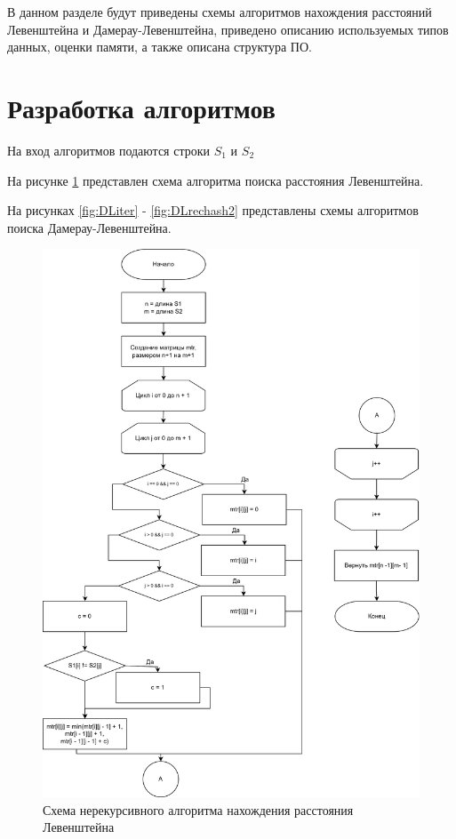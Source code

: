 \documentclass[a4paper,14pt, unknownkeysallowed]{bmstu}
\begin{document}
В данном разделе будут приведены схемы алгоритмов нахождения расстояний Левенштейна и Дамерау-Левенштейна, приведено описанию используемых типов данных, оценки памяти, а также описана структура ПО.

\section{Разработка алгоритмов}

На вход алгоритмов подаются строки $S_1$ и $S_2$

На рисунке \ref{fig:Liter} представлен схема алгоритма поиска расстояния Левенштейна.

На рисунках \ref{fig:DLiter} - \ref{fig:DLrechash2} представлены схемы алгоритмов поиска Дамерау-Левенштейна.

\begin{figure}[h]
	\centering
	\includegraphics[height=0.8\textheight]{img/levmatr.png}
	\caption{Схема нерекурсивного алгоритма нахождения расстояния Левенштейна}
	\label{fig:Liter}
\end{figure}
\end{document}
